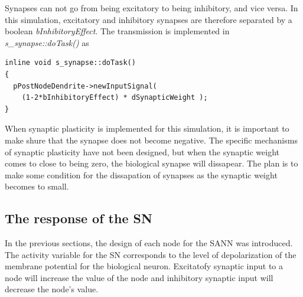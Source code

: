 	Synapses can not go from being excitatory to being inhibitory, and vice versa.
	In this simulation, excitatory and inhibitory synapses are therefore separated by a boolean \emph{bInhibitoryEffect}. The transmission is implemented in \emph{s\_synapse::doTask()} as
\begin{lstlisting}
inline void s_synapse::doTask()
{
  pPostNodeDendrite->newInputSignal( 
    (1-2*bInhibitoryEffect) * dSynapticWeight );
}
\end{lstlisting}
	When synaptic plasticity is implemented for this simulation, it is important to make shure that the synapse does not become negative. 
	The specific mechanisms of synaptic plasticity have not been designed, but when the synaptic weight comes to close to being zero, the biological synapse will dissapear.
	The plan is to make some condition for the dissapation of synapses as the synaptic weight becomes to small.

\subsection{The response of the SN}
	In the previous sections, the design of each node for the SANN was introduced.
	The activity variable for the SN corresponds to the level of depolarization of the membrane potential for the biological neuron.
	Excitatofy synaptic input to a node will increase the value of the node and inhibitory synaptic input will decrease the node's value.

